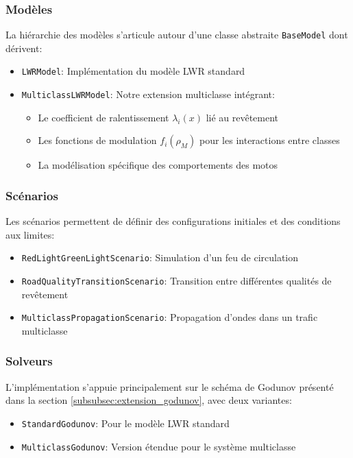 \subsubsection{Modèles}
La hiérarchie des modèles s'articule autour d'une classe abstraite \texttt{BaseModel} dont dérivent:
\begin{itemize}
\item \texttt{LWRModel}: Implémentation du modèle LWR standard
\item \texttt{MulticlassLWRModel}: Notre extension multiclasse intégrant:
  \begin{itemize}
  \item Le coefficient de ralentissement $\lambda_i(x)$ lié au revêtement
  \item Les fonctions de modulation $f_i(\rho_M)$ pour les interactions entre classes
  \item La modélisation spécifique des comportements des motos
  \end{itemize}
\end{itemize}

\subsubsection{Scénarios}
Les scénarios permettent de définir des configurations initiales et des conditions aux limites:
\begin{itemize}
\item \texttt{RedLightGreenLightScenario}: Simulation d'un feu de circulation
\item \texttt{RoadQualityTransitionScenario}: Transition entre différentes qualités de revêtement
\item \texttt{MulticlassPropagationScenario}: Propagation d'ondes dans un trafic multiclasse
\end{itemize}

\subsubsection{Solveurs}
L'implémentation s'appuie principalement sur le schéma de Godunov présenté dans la section \ref{subsubsec:extension_godunov}, avec deux variantes:
\begin{itemize}
\item \texttt{StandardGodunov}: Pour le modèle LWR standard
\item \texttt{MulticlassGodunov}: Version étendue pour le système multiclasse
\end{itemize}


